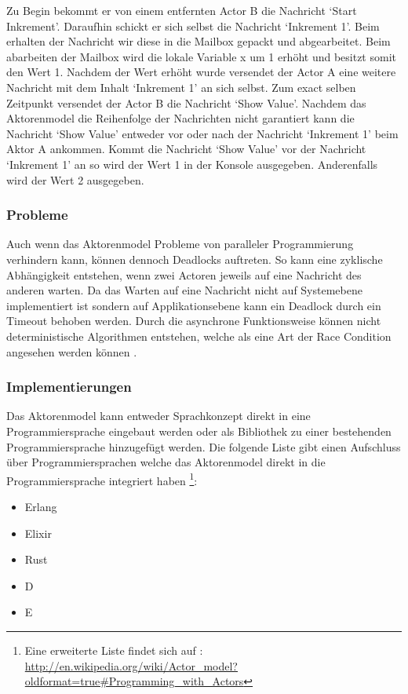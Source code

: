 Zu Begin bekommt er von einem entfernten Actor B die Nachricht `Start Inkrement'. Daraufhin schickt er sich selbst die Nachricht `Inkrement 1'. Beim erhalten der Nachricht wir diese in die Mailbox gepackt und abgearbeitet. Beim abarbeiten der Mailbox wird die lokale Variable x um 1 erhöht und besitzt somit den Wert 1. Nachdem der Wert erhöht wurde versendet der Actor A eine weitere Nachricht mit dem Inhalt `Inkrement 1' an sich selbst. Zum exact selben Zeitpunkt versendet der Actor B die Nachricht `Show Value'. Nachdem das Aktorenmodel  die Reihenfolge der Nachrichten nicht garantiert kann die Nachricht `Show Value' entweder vor oder nach der Nachricht `Inkrement 1' beim Aktor A ankommen. Kommt die Nachricht `Show Value' vor der Nachricht `Inkrement 1' an so wird der Wert 1 in der Konsole ausgegeben. Anderenfalls wird der Wert 2 ausgegeben.

\subsubsection{Probleme}
Auch wenn das Aktorenmodel Probleme von paralleler Programmierung verhindern kann, können dennoch Deadlocks auftreten. So kann eine zyklische Abhängigkeit entstehen, wenn zwei Actoren jeweils auf eine Nachricht des anderen warten. Da das Warten auf eine Nachricht nicht auf Systemebene implementiert ist sondern auf Applikationsebene kann ein Deadlock durch ein Timeout behoben werden. Durch die asynchrone Funktionsweise können nicht deterministische Algorithmen entstehen, welche als eine Art der Race Condition angesehen werden können \cite[p. 86]{Erb2012}. 

\subsubsection{Implementierungen}
Das Aktorenmodel kann entweder Sprachkonzept direkt in eine Programmiersprache eingebaut werden oder als Bibliothek zu einer bestehenden Programmiersprache hinzugefügt werden. Die folgende Liste gibt einen Aufschluss über Programmiersprachen welche das Aktorenmodel direkt in die Programmiersprache integriert haben \footnote{Eine erweiterte Liste findet sich auf  \cite[p. 86]{Erb2012}: \url{http://en.wikipedia.org/wiki/Actor_model?oldformat=true#Programming_with_Actors}}:

\begin{itemize}
  \item Erlang
  \item Elixir
  \item Rust
  \item D
  \item E
\end{itemize}

